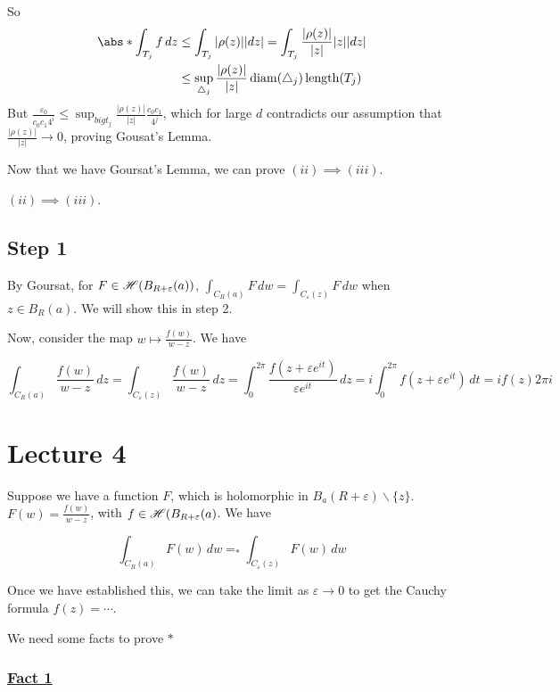 \documentclass[x11names,reqno,14pt]{extarticle}
\newcommand{\bigt}{\bigtriangleup}
\begin{document}
So 
\begin{align*}
\abs*{\int_{T_j}f\,dz} & \leq \int_{T_j}|\rho(z)||dz| = \int_{T_j}\frac{|\rho(z)|}{|z|}|z||dz| \\
						& \leq \sup_{\bigt_j}\frac{|\rho(z)|}{|z|}\operatorname{diam}(\bigt_j)\operatorname{length}(T_j) \\
\end{align*}
But $\frac{\varepsilon_0}{c_0c_1 4^i}\leq \sup_{bigt_j}\frac{|\rho(z)|}{|z|}\frac{c_0c_1}{4^j}$, which for large $d$ contradicts our assumption that $\frac{|\rho(z)|}{|z|}\to0$, proving Gousat's Lemma. 

Now that we have Goursat's Lemma, we can prove $(ii)\implies(iii)$. 

\prop $(ii)\implies(iii)$. 

\proof



\subsection*{Step 1}


By Goursat, for $F \in \mathscr{H}(B_{R + \varepsilon}(a))$, $\int_{C_R(a)}F\,dw = \int_{C_\varepsilon(z)}F\,dw$ when $z \in B_{R}(a)$. We will show this in step 2. 

Now, consider the map $w\mapsto \frac{f(w)}{w - z}$. We have

\[
\int_{C_R(a)}\frac{f(w)}{w - z}\,dz = \int_{C_\varepsilon(z)}\frac{f(w)}{w - z}\,dz = \int_0^{2\pi}\frac{f(z + \varepsilon e^{it})}{\varepsilon e^{it}}\,dz = i\int_0^{2\pi}f(z + \varepsilon e^{it})\,dt = if(z)2\pi i
\]

\section*{Lecture 4}

Suppose we have a function $F$, which is holomorphic in $B_a(R+ \varepsilon)\backslash\{z\}$. $F(w) = \frac{f(w)}{w - z}$, with $f \in \mathscr{H}(B_{R+\varepsilon}(a)$. We have

\[
\int_{C_R(a)}F(w)\,dw =_* \int_{C_\varepsilon(z)}F(w)\,dw
\]

Once we have established this, we can take the limit as $\varepsilon\to0$ to get the Cauchy formula $f(z) = \cdots$. 

We need some facts to prove $*$

\subsubsection*{\underline{Fact 1}} 
\end{document}
